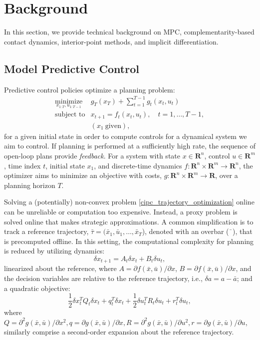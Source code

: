 \section{Background} \label{cipc_background}
In this section, we provide technical background on MPC, complementarity-based contact dynamics, interior-point methods, and implicit differentiation.

\subsection{Model Predictive Control}
Predictive control policies \cite{richalet1978model} optimize a planning problem:
\begin{equation}
	\begin{array}{ll}
		\underset{x_{1:T}, u_{1:T-1}}{\mbox{minimize}} & g_T(x_T) + \sum \limits_{t = 1}^{T-1} g_t(x_t, u_t) \label{cipc_trajectory_optimization}\\
		\mbox{subject to} & x_{t+1} = f_t(x_t,u_t), \quad t = 1,\dots,T-1,\\
		& (x_1~\mbox{given}),
	\end{array}
\end{equation}
for a given initial state in order to compute controls for a dynamical system we aim to control. If planning is performed at a sufficiently high rate, the sequence of open-loop plans provide \textit{feedback}. For a system with state $x \in \mathbf{R}^{n}$, control $u \in \mathbf{R}^{m}$, time index $t$, initial state $x_1$, and discrete-time dynamics $f : \mathbf{R}^{n} \times \mathbf{R}^{m} \rightarrow \mathbf{R}^{n}$, the optimizer aims to minimize an objective with costs, $g: \mathbf{R}^{n} \times \mathbf{R}^{m} \rightarrow \mathbf{R}$, over a planning horizon $T$.

Solving a (potentially) non-convex problem \eqref{cipc_trajectory_optimization} online can be unreliable or computation too expensive. Instead, a proxy problem is solved online that makes strategic approximations. A common simplification is to track a reference trajectory, $\bar{\tau} = (\bar{x}_1, \bar{u}_1, \dots, \bar{x}_T$), denoted with an overbar ($\bar{\phantom{a}}$), that is precomputed offline. In this setting, the computational complexity for planning is reduced by utilizing dynamics:
\begin{equation}
	\delta x_{t+1} = A_t \delta x_t + B_t \delta u_t, \label{cipc_linear_dynamics}
\end{equation}
linearized about the reference, where $A = \partial f(\bar{x}, \bar{u}) / \partial x$, $B = \partial f(\bar{x}, \bar{u}) / \partial x$, and the decision variables are relative to the reference trajectory, i.e., $\delta a = a - \bar{a}$; and a quadratic objective:
\begin{equation}
	\frac{1}{2}\delta x_t^T Q_t \delta x_t + q_t^T \delta x_t + \frac{1}{2}\delta u_t^T R_t \delta u_t  + r_t^T \delta u_t, \label{cipc_quadratic_objective}
\end{equation}
where $Q = \partial^2 g(\bar{x}, \bar{u}) / \partial x^2, q = \partial g(\bar{x}, \bar{u}) / \partial x, R = \partial^2 g(\bar{x}, \bar{u}) / \partial u^2, r = \partial g(\bar{x}, \bar{u}) / \partial u$, similarly comprise a second-order expansion about the reference trajectory.


